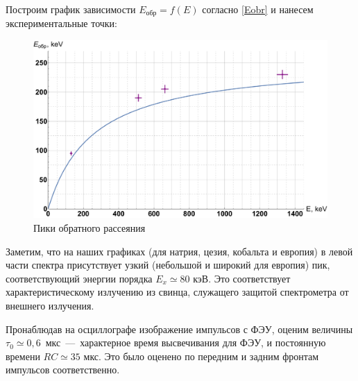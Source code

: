 \documentclass[12pt]{kiarticle}
\begin{document}
Построим график зависимости $ E_{обр} = f(E) $ согласно \eqref{Eobr} и нанесем экспериментальные точки:

	\begin{figure}[H]
	\label{graf_obr}
	\includegraphics[scale=0.45]{ee.pdf}
	\caption{Пики обратного рассеяния}
\end{figure} 

Заметим, что на наших графиках (для натрия, цезия, кобальта и европия) в левой части спектра присутствует узкий (небольшой и широкий для европия) пик, соответствующий энергии порядка $ E_x \simeq 80 $ кэВ. Это соответствует характеристическому излучению из свинца, служащего защитой спектрометра от внешнего излучения. 

Пронаблюдав на осциллографе изображение импульсов с ФЭУ, оценим величины $ \tau_0 \simeq 0,6 $~мкс~---~характерное время высвечивания для ФЭУ, и постоянную времени $ RC \simeq 35 $ мкс. Это было оценено по передним и задним фронтам импульсов соответственно. 
	
	
\end{document}
